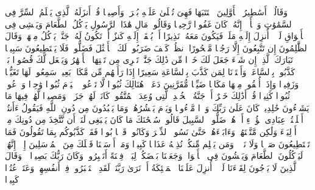 \stopbuffer%
\startbuffer[\q:25:5]
وَقَالُوۤا۟ أَسَٰطِیرُ ٱلۡأَوَّلِینَ ٱكۡتَتَبَهَا فَهِیَ تُمۡلَىٰ عَلَیۡهِ بُكۡرَةࣰ وَأَصِیلࣰا%
\stopbuffer%
\startbuffer[\q:25:6]
قُلۡ أَنزَلَهُ ٱلَّذِی یَعۡلَمُ ٱلسِّرَّ فِی ٱلسَّمَٰوَٰتِ وَٱلۡأَرۡضِۚ إِنَّهُۥ كَانَ غَفُورࣰا رَّحِیمࣰا%
\stopbuffer%
\startbuffer[\q:25:7]
وَقَالُوا۟ مَالِ هَٰذَا ٱلرَّسُولِ یَأۡكُلُ ٱلطَّعَامَ وَیَمۡشِی فِی ٱلۡأَسۡوَاقِ لَوۡلَاۤ أُنزِلَ إِلَیۡهِ مَلَكࣱ فَیَكُونَ مَعَهُۥ نَذِیرًا%
\stopbuffer%
\startbuffer[\q:25:8]
أَوۡ یُلۡقَىٰۤ إِلَیۡهِ كَنزٌ أَوۡ تَكُونُ لَهُۥ جَنَّةࣱ یَأۡكُلُ مِنۡهَاۚ وَقَالَ ٱلظَّٰلِمُونَ إِن تَتَّبِعُونَ إِلَّا رَجُلࣰا مَّسۡحُورًا%
\stopbuffer%
\startbuffer[\q:25:9]
ٱنظُرۡ كَیۡفَ ضَرَبُوا۟ لَكَ ٱلۡأَمۡثَٰلَ فَضَلُّوا۟ فَلَا یَسۡتَطِیعُونَ سَبِیلࣰا%
\stopbuffer%
\startbuffer[\q:25:10]
تَبَارَكَ ٱلَّذِیۤ إِن شَاۤءَ جَعَلَ لَكَ خَیۡرࣰا مِّن ذَٰلِكَ جَنَّٰتࣲ تَجۡرِی مِن تَحۡتِهَا ٱلۡأَنۡهَٰرُ وَیَجۡعَل لَّكَ قُصُورَۢا%
\stopbuffer%
\startbuffer[\q:25:11]
بَلۡ كَذَّبُوا۟ بِٱلسَّاعَةِۖ وَأَعۡتَدۡنَا لِمَن كَذَّبَ بِٱلسَّاعَةِ سَعِیرًا%
\stopbuffer%
\startbuffer[\q:25:12]
إِذَا رَأَتۡهُم مِّن مَّكَانِۭ بَعِیدࣲ سَمِعُوا۟ لَهَا تَغَیُّظࣰا وَزَفِیرࣰا%
\stopbuffer%
\startbuffer[\q:25:13]
وَإِذَاۤ أُلۡقُوا۟ مِنۡهَا مَكَانࣰا ضَیِّقࣰا مُّقَرَّنِینَ دَعَوۡا۟ هُنَالِكَ ثُبُورࣰا%
\stopbuffer%
\startbuffer[\q:25:14]
لَّا تَدۡعُوا۟ ٱلۡیَوۡمَ ثُبُورࣰا وَٰحِدࣰا وَٱدۡعُوا۟ ثُبُورࣰا كَثِیرࣰا%
\stopbuffer%
\startbuffer[\q:25:15]
قُلۡ أَذَٰلِكَ خَیۡرٌ أَمۡ جَنَّةُ ٱلۡخُلۡدِ ٱلَّتِی وُعِدَ ٱلۡمُتَّقُونَۚ كَانَتۡ لَهُمۡ جَزَاۤءࣰ وَمَصِیرࣰا%
\stopbuffer%
\startbuffer[\q:25:16]
لَّهُمۡ فِیهَا مَا یَشَاۤءُونَ خَٰلِدِینَۚ كَانَ عَلَىٰ رَبِّكَ وَعۡدࣰا مَّسۡءُولࣰا%
\stopbuffer%
\startbuffer[\q:25:17]
وَیَوۡمَ یَحۡشُرُهُمۡ وَمَا یَعۡبُدُونَ مِن دُونِ ٱللَّهِ فَیَقُولُ ءَأَنتُمۡ أَضۡلَلۡتُمۡ عِبَادِی هَٰۤؤُلَاۤءِ أَمۡ هُمۡ ضَلُّوا۟ ٱلسَّبِیلَ%
\stopbuffer%
\startbuffer[\q:25:18]
قَالُوا۟ سُبۡحَٰنَكَ مَا كَانَ یَنۢبَغِی لَنَاۤ أَن نَّتَّخِذَ مِن دُونِكَ مِنۡ أَوۡلِیَاۤءَ وَلَٰكِن مَّتَّعۡتَهُمۡ وَءَابَاۤءَهُمۡ حَتَّىٰ نَسُوا۟ ٱلذِّكۡرَ وَكَانُوا۟ قَوۡمَۢا بُورࣰا%
\stopbuffer%
\startbuffer[\q:25:19]
فَقَدۡ كَذَّبُوكُم بِمَا تَقُولُونَ فَمَا تَسۡتَطِیعُونَ صَرۡفࣰا وَلَا نَصۡرࣰاۚ وَمَن یَظۡلِم مِّنكُمۡ نُذِقۡهُ عَذَابࣰا كَبِیرࣰا%
\stopbuffer%
\startbuffer[\q:25:20]
وَمَاۤ أَرۡسَلۡنَا قَبۡلَكَ مِنَ ٱلۡمُرۡسَلِینَ إِلَّاۤ إِنَّهُمۡ لَیَأۡكُلُونَ ٱلطَّعَامَ وَیَمۡشُونَ فِی ٱلۡأَسۡوَاقِۗ وَجَعَلۡنَا بَعۡضَكُمۡ لِبَعۡضࣲ فِتۡنَةً أَتَصۡبِرُونَۗ وَكَانَ رَبُّكَ بَصِیرࣰا%
\stopbuffer%
\startbuffer[\q:25:21]
۞ وَقَالَ ٱلَّذِینَ لَا یَرۡجُونَ لِقَاۤءَنَا لَوۡلَاۤ أُنزِلَ عَلَیۡنَا ٱلۡمَلَٰۤئِكَةُ أَوۡ نَرَىٰ رَبَّنَاۗ لَقَدِ ٱسۡتَكۡبَرُوا۟ فِیۤ أَنفُسِهِمۡ وَعَتَوۡ عُتُوࣰّا كَبِیرࣰا%
